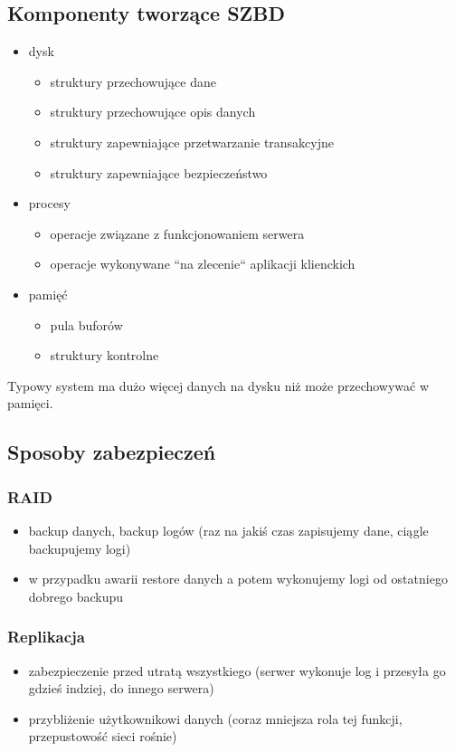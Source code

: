 \documentclass[12pt]{article}
\begin{document}
\subsection{Komponenty tworzące \ac{SZBD}}
\begin{itemize}
\item dysk
\begin{itemize}
\item struktury przechowujące dane
\item struktury przechowujące opis danych
\item struktury zapewniające przetwarzanie transakcyjne
\item struktury zapewniające bezpieczeństwo
\end{itemize}
\item procesy
\begin{itemize}
\item operacje związane z funkcjonowaniem serwera
\item operacje wykonywane ``na zlecenie`` aplikacji klienckich
\end{itemize}
\item pamięć
\begin{itemize}
\item pula buforów
\item struktury kontrolne
\end{itemize}
\end{itemize}

Typowy system ma dużo więcej danych na dysku niż może przechowywać w pamięci.

\subsection{Sposoby zabezpieczeń}
\subsubsection{\acs{RAID}}
\begin{itemize}
\item backup danych, backup logów (raz na jakiś czas zapisujemy dane, ciągle backupujemy logi)
\item w przypadku awarii restore danych a potem wykonujemy logi od ostatniego dobrego backupu
\end{itemize}

\subsubsection{Replikacja}
\begin{itemize}
\item zabezpieczenie przed utratą wszystkiego (serwer wykonuje log i przesyła go gdzieś indziej, do innego serwera)
\item przybliżenie użytkownikowi danych (coraz mniejsza rola tej funkcji, przepustowość sieci rośnie)
\end{itemize}
\end{document}
